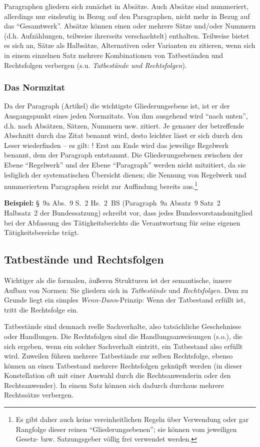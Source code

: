 Paragraphen gliedern sich zunächst in Absätze. Auch Absätze sind nummeriert, allerdings nur eindeutig in Bezug auf den Paragraphen, nicht mehr in Bezug auf das \enquote{Gesamtwerk}. Absätze können einen oder mehrere Sätze und/oder Nummern (d.h. Aufzählungen, teilweise ihrerseits verschachtelt) enthalten. Teilweise bietet es sich an, Sätze als Halbsätze, Alternativen oder Varianten zu zitieren, wenn sich in einem einzelnen Satz mehrere Kombinationen von Tatbeständen und Rechtsfolgen verbergen (s.u. \emph{Tatbestände und Rechtsfolgen}).

\subsubsection{Das Normzitat}
Da der Paragraph (Artikel) die wichtigste Gliederungsebene ist, ist er der Ausgangspunkt eines jeden Normzitats. Von ihm ausgehend wird \enquote{nach unten}, d.h. nach Absätzen, Sätzen, Nummern usw. zitiert. Je genauer der betreffende Abschnitt durch das Zitat benannt wird, desto leichter lässt er sich durch den Leser wiederfinden – es gilt: ! Erst am Ende wird das jeweilige Regelwerk benannt, dem der Paragraph entstammt. Die Gliederungsebenen zwischen der Ebene \enquote{Regelwerk} und der Ebene \enquote{Paragraph} werden nicht mitzitiert, da sie lediglich der systematischen Übersicht dienen; die Nennung von Regelwerk und nummeriertem Paragraphen reicht zur Auffindung bereits aus.\footnote{Es gibt daher auch keine vereinheitlichen Regeln über Verwendung oder gar Rangfolge dieser reinen \enquote{Gliederungsebenen}; sie können vom jeweiligen Gesetz- bzw. Satzungsgeber völlig frei verwendet werden.}

\textbf{Beispiel:} \S~9a Abs.~9 S.~2 Hs.~2~BS (Paragraph~9a Absatz~9 Satz~2 Halbsatz~2 der Bundessatzung) schreibt vor, dass jedes Bundesvorstandsmitglied bei der Abfassung des Tätigkeitsberichts die Verantwortung für seine eigenen Tätigkeitsbereiche trägt. 

\subsection{Tatbestände und Rechtsfolgen}
Wichtiger als die formalen, äußeren Strukturen ist der semantische, innere Aufbau von Normen: Sie gliedern sich in \emph{Tatbestände} und \emph{Rechtsfolgen}. Dem zu Grunde liegt ein simples \emph{Wenn-Dann}-Prinzip: Wenn der Tatbestand erfüllt ist, tritt die Rechtsfolge ein.

Tatbestände sind demnach reelle Sachverhalte, also tatsächliche Geschehnisse oder Handlungen. Die Rechtsfolgen sind die Handlungsanweisungen (s.o.), die sich ergeben, wenn ein solcher Sachverhalt eintritt, ein Tatbestand also erfüllt wird. Zuweilen führen mehrere Tatbestände zur selben Rechtsfolge, ebenso können an einen Tatbestand mehrere Rechtsfolgen geknüpft werden (in dieser Konstellation oft mit einer Auswahl durch die Rechtsanwenderin oder den Rechtsanwender). In einem Satz können sich dadurch durchaus mehrere Rechtssätze verbergen.

